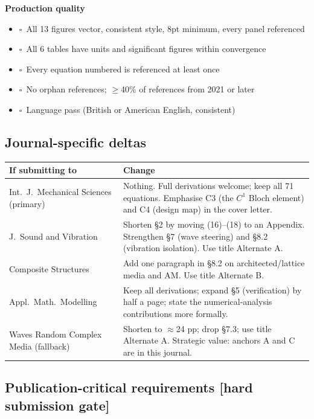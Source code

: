 \documentclass[11pt,a4paper]{article}
\newcommand{\bp}[1]{\textcolor{accent}{\textsf{\footnotesize [#1]}}}
\newcommand{\chk}{$\square$~}
\begin{document}
\textbf{Production quality}
\begin{itemize}
\item \chk All 13 figures vector, consistent style, 8pt minimum, every panel referenced
\item \chk All 6 tables have units and significant figures within convergence
\item \chk Every equation numbered is referenced at least once
\item \chk No orphan references; $\ge$40\% of references from 2021 or later
\item \chk Language pass (British or American English, consistent)
\end{itemize}

\subsection{Journal-specific deltas}
\label{sec:submission}

\begin{tabularx}{\textwidth}{@{}L{4.6cm} Y@{}}
\toprule
If submitting to & Change \\
\midrule
Int.\ J.\ Mechanical Sciences (primary) & Nothing. Full derivations welcome; keep all 71 equations. Emphasise C3 (the $C^1$ Bloch element) and C4 (design map) in the cover letter. \\
J.\ Sound and Vibration & Shorten \S2 by moving (16)--(18) to an Appendix. Strengthen \S7 (wave steering) and \S8.2 (vibration isolation). Use title Alternate A. \\
Composite Structures & Add one paragraph in \S8.2 on architected/lattice media and AM. Use title Alternate B. \\
Appl.\ Math.\ Modelling & Keep all derivations; expand \S5 (verification) by half a page; state the numerical-analysis contributions more formally. \\
Waves Random Complex Media (fallback) & Shorten to $\approx$24 pp; drop \S7.3; use title Alternate A. Strategic value: anchors A and C are in this journal. \\
\bottomrule
\end{tabularx}

\subsection{Publication-critical requirements \bp{hard submission gate}}
\label{sec:pcr}
\end{document}

